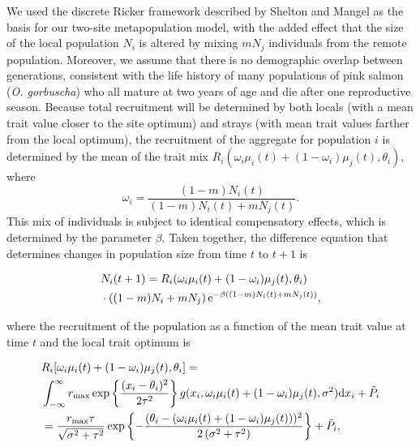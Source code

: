 \documentclass{revtex4}
\begin{document}
We used the discrete Ricker framework described by Shelton and Mangel \citep{Shelton:2011eq} as the basis for our two-site metapopulation model, with the added effect that the size of the local population $N_i$ is altered by mixing $mN_j$ individuals from the remote population.
Moreover, we assume that there is no demographic overlap between generations, consistent with the life history of many populations of pink salmon (\emph{O. gorbuscha}) who all mature at two years of age and die after one reproductive season.
Because total recruitment will be determined by both locals (with a mean trait value closer to the site optimum) and strays (with mean trait values farther from the local optimum), the recruitment of the aggregate for population $i$ is determined by the mean of the trait mix $R_i(\omega_i\mu_i(t) + (1-\omega_i)\mu_j(t),\theta_i)$, where
\begin{equation}
\omega_i=\frac{(1-m)N_i(t)}{(1-m) N_i(t) + m N_j(t)}.
\end{equation}
This mix of individuals is subject to identical compensatory effects, which is determined by the parameter $\beta$.
Taken together, the difference equation that determines changes in population size from time $t$ to $t+1$ is

\begin{align}
  \label{eq:N}
  &N_i(t+1) = R_i(\omega_i\mu_i(t) + (1-\omega_i)\mu_j(t),\theta_i) \\ \nonumber
  &\cdot \left((1-m)N_i + mN_j\right){\rm e}^{-\beta ((1-m)N_i(t) + m N_j(t))},
\end{align}

\noindent where the recruitment of the population as a function of the mean trait value at time $t$ and the local trait optimum is

\begin{align}
  \label{eq:R}
  &R_i[\omega_i\mu_i(t) + (1-\omega_i)\mu_j(t),\theta_i] = \\ \nonumber
  &\int_{-\infty}^\infty r_{\rm max}\exp\left\{\frac{(x_i-\theta_i)^2}{2\tau^2}\right\} g(x_i,\omega_i\mu_i(t) + (1-\omega_i)\mu_j(t),\sigma^2) {\rm d}x_i +\tilde{P}_i\\ \nonumber
  &= \frac{r_{\rm max} \tau  }{\sqrt{\sigma ^2+\tau ^2}}\exp\left\{-\frac{(\theta_i-(\omega_i\mu_i(t) + (1-\omega_i)\mu_j(t)))^2}{2 \left(\sigma ^2+\tau ^2\right)}\right\} +\tilde{P}_i,
\end{align}
\end{document}
